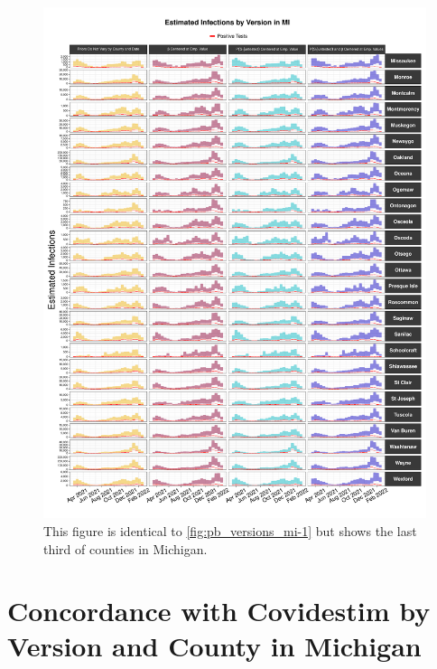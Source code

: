 \documentclass[12pt,twoside]{smiththesis}
\begin{document}
\begin{figure}

{\centering \includegraphics[width=1\linewidth]{figure/mi3_pb_compared_to_observed} 

}

\caption{\label{fig:pb_versions_mi-3} This figure is identical to \ref{fig:pb_versions_mi-1} but shows the last third of counties in Michigan.}\label{fig:unnamed-chunk-116}
\end{figure}
\hypertarget{concordance-with-covidestim-by-version-and-county-in-michigan}{%
\section{Concordance with Covidestim by Version and County in Michigan}\label{concordance-with-covidestim-by-version-and-county-in-michigan}}
\end{document}
